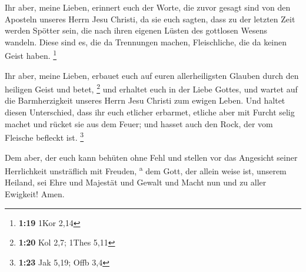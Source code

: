  Ihr aber, meine Lieben, erinnert euch der Worte, die
zuvor gesagt sind von den Aposteln unseres Herrn Jesu Christi,
 da sie euch sagten, dass zu der letzten Zeit werden
Spötter sein, die nach ihren eigenen Lüsten des gottlosen Wesens
wandeln.  Diese sind es, die da Trennungen machen,
Fleischliche, die da keinen Geist haben. \footnote{\textbf{1:19} 1Kor
  2,14}

 Ihr aber, meine Lieben, erbauet euch auf euren
allerheiligsten Glauben durch den heiligen Geist und betet, \footnote{\textbf{1:20}
  Kol 2,7; 1Thes 5,11}  und erhaltet euch in der Liebe
Gottes, und wartet auf die Barmherzigkeit unseres Herrn Jesu Christi zum
ewigen Leben.  Und haltet diesen Unterschied, dass ihr
euch etlicher erbarmet,  etliche aber mit Furcht selig
machet und rücket sie aus dem Feuer; und hasset auch den Rock, der vom
Fleische befleckt ist. \footnote{\textbf{1:23} Jak 5,19; Offb 3,4}

 Dem aber, der euch kann behüten ohne Fehl und stellen
vor das Angesicht seiner Herrlichkeit unsträflich mit Freuden,
\textsuperscript{a}  dem Gott, der allein weise ist,
unserem Heiland, sei Ehre und Majestät und Gewalt und Macht nun und zu
aller Ewigkeit! Amen.
